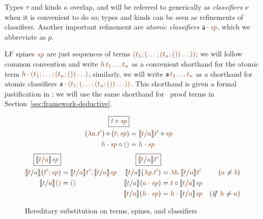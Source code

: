 \noindent
Types $\tau$ and kinds $\kappa$ overlap, and will be referred to
generically as {\it classifiers} $\nu$ when it is convenient to do so;
types and kinds can be seen as refinements of classifiers. Another
important refinement are {\it atomic classifiers} $\lfroot{\sf
  a}{\spi}$, which we abbreviate as $p$.

LF spines $\lf\spi$ are just sequences of terms $\lf{(t_1; (\ldots;
  (t_n;())\ldots))}$; we will follow common convention and write
$\lf{h\,t_1\ldots t_n}$ as a convenient shorthand for the atomic term
$\lf{\lfroot{h}{(t_1; \ldots; (t_n;())\ldots)}}$; similarly, we will
write ${\sf a}\,\lf{t_1\ldots t_n}$ as a shorthand for atomic
classifiers $\lfroot{\sf a}{(t_1;
  (\ldots; (t_n;())\ldots))}$. This shorthand is given a formal justification
in \cite{cervesato02linear}; we will use the same shorthand for 
\sls~proof terms in Section~\ref{sec:framework-deductive}.


\begin{figure}[t]
\begin{align*}
\fbox{$\subst{\lf{t}}{\lf{\spi}}$}
\\
\subst{(\lf{\lambda a. t'})}{(\lf{t; \spi})}
 & = \subst{\rsubst{\lf{t}}{\lf{a}}{\lf{t'}}}{\lf{\spi}}
\\
\subst{\lfroot{\lf h}{\spi}}{\lfnil}
 & = \lfroot{\lf h}{\spi}
\end{align*}\begin{align*}
\fbox{$\rsubst{\lf{t}}{\lf{a}}{\lf{\spi}}$}&
&
\fbox{$\rsubst{\lf{t}}{\lf{a}}{\lf{t'}}$}&
&
\\
\rsubst{\lf t}{\lf a}{(\lf{t'; \spi})}
 & = \lf{\no{\rsubst{\lf t}{\lf a}{\lf{t'}}}; 
         \no{\rsubst{\lf t}{\lf a}{\lf{\spi}}}} &
\rsubst{\lf t}{\lf a}(\lf{\lambda y. t'})
 & = \lf{\lambda b.\, \no{\rsubst{\lf t}{\lf a}{\lf{t'}}}} 
      & (\lf a \neq \lf b) 
\\
\rsubst{\lf t}{\lf a}{\lfnil} 
 & = \lfnil &
\rsubst{\lf t}{\lf a}{(\lf{\lfroot{a}{\spi}})}
 & = \subst{\lf t}{\rsubst{\lf t}{\lf a}{\lf{\spi}}}
\\
& & 
\rsubst{\lf t}{\lf a}{(\lf{\lfroot{h}{\spi}})}
 & = \lfroot{\lf h}{\no{\rsubst{\lf t}{\lf a}{\lf{\spi}}}}
      & ({\it if}~ \lf{h} \neq \lf{a})
\end{align*}
\caption{Hereditary substitution on terms, spines, and classifiers}
\label{fig:lf-hsubst}
\end{figure}

